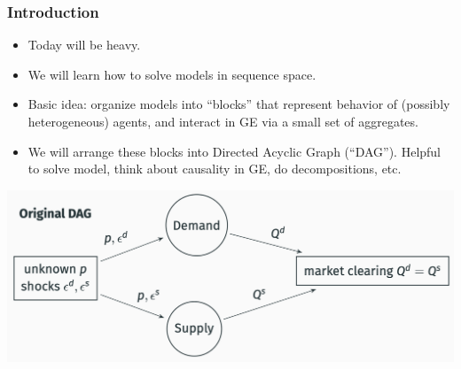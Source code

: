 \documentclass[english,xcolor=svgnames]{beamer}
\begin{document}
\begin{frame}
   \frametitle{Introduction}
   \begin{itemize}
       \item Today will be heavy.
       \item We will learn how to solve models in sequence space.
       \item Basic idea: organize models into ``blocks'' that represent behavior of (possibly heterogeneous) agents, and interact in GE via a small set of aggregates.
       \item We will arrange these blocks into Directed Acyclic Graph (``DAG''). Helpful to solve model, think about causality in GE, do decompositions, etc.
   \end{itemize}
   \centering
   \includegraphics[scale=0.3]{dag/demandsupply.png}
\end{frame}


\end{document}
